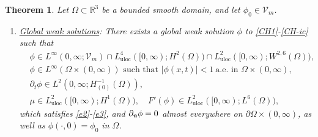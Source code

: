 \documentclass[11pt,reqno]{amsart}
\newtheorem{theorem}{Theorem}[section]
\theoremstyle{remark}
\def\n{\textbf{\textit{n}}}
\def\R{\mathbb{R}}
\numberwithin{equation}{section}
\newcommand{\uloc}{\operatorname{uloc}}
\begin{document}
\begin{theorem}
\label{well-pos-3D}
Let $\Omega\subset \R^3$ be a bounded smooth domain, and let $\phi_0\in \mathcal{V}_m$.
\begin{enumerate}
\item \underline{Global weak solutions}: There exists a global weak solution $\phi$ to
\eqref{CH1}-\eqref{CH-ic} such that
\begin{align}
\label{WS1-3}
&\phi \in  L^\infty( 0,\infty; \mathcal{V}_m)\cap L_{\uloc}^4([0,\infty);H^2(\Omega))\cap L_{\uloc}^2([0,\infty);W^{2,6}(\Omega)),
\\
\label{WS2-3}
&\phi \in L^{\infty}(\Omega\times (0,\infty)) \text{ such that }  |\phi(x,t)|<1  \ \text{a.e. in }\Omega\times (0,\infty),
\\
\label{WS3-3}
&\partial_t \phi \in L^2(0,\infty; H_{(0)}^{-1}(\Omega)),
\\
\label{WS4-3}
& \mu \in L_{\uloc}^2([0,\infty);H^1(\Omega)), \quad F'(\phi)\in L_{\uloc}^2([0,\infty);L^6(\Omega)),
\end{align}
which satisfies \eqref{e2}-\eqref{e3}, and $\partial_\n \phi=0$ almost everywhere on $\partial\Omega\times(0,\infty)$, as well as
$\phi(\cdot,0)=\phi_0$ in $\Omega$.


\end{enumerate}
\end{theorem}
\end{document}
